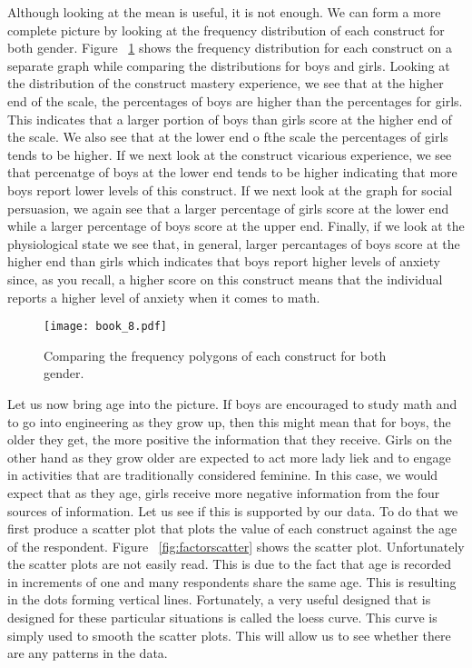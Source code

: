 \documentclass[a4paper,12pt,oneside]{book}
\begin{document}
Although looking at the mean is useful, it is not enough. We can form a more complete picture by looking at the frequency distribution of each
construct for both gender. Figure ~\ref{fig:freqpoly} shows the frequency distribution for each construct on a separate graph while comparing the
distributions for boys and girls. Looking at the distribution of the construct mastery experience, we see that at the higher end of the scale,
the percentages of boys are higher than the percentages for girls. This indicates that a larger portion of boys than girls score at the higher 
end of the scale. We also see that at the lower end o fthe scale the percentages of girls tends to be higher. If we next look at the construct 
vicarious experience, we see that percenatge of boys at the lower end tends to be higher indicating that more boys report lower levels of this
construct. If we next look at the graph for social persuasion, we again see that a larger percentage of girls score at the lower end while a larger
percentage of boys score at the upper end. Finally, if we look at the physiological state we see that, in general, larger percantages of boys score
at the higher end than girls which indicates that boys report higher levels of anxiety since, as you recall, a higher score on this construct
means that the individual reports a higher level of anxiety when it comes to math.   

\begin{stlog}\end{stlog}
\begin{figure}[h]
    \centering
    \texttt{[image: book\_8.pdf]}
    \caption{Comparing the frequency polygons of each construct for both gender.}
    \label{fig:freqpoly}
\end{figure}

Let us now bring age into the picture. If boys are encouraged to study math and to go into engineering as they grow up, then this might mean that
for boys, the older they get, the more positive the information that they receive. Girls on the other hand as they grow older are expected to
act more lady liek and to engage in activities that are traditionally considered feminine. In this case, we would expect that as they age, girls 
receive more negative information from the four sources of information. Let us see if this is supported by our data. To do that we first produce
a scatter plot that plots the value of each construct against the age of the respondent. Figure ~\ref{fig:factorscatter} shows the scatter plot.
Unfortunately the scatter plots are not easily read. This is due to the fact that age is recorded in increments of one and many respondents
share the same age. This is resulting in the dots forming vertical lines. Fortunately, a very useful designed that is designed for these particular 
situations is called the loess curve. This curve is simply used to smooth the scatter plots. This will allow us to see whether there are any 
patterns in the data. 
\end{document}
